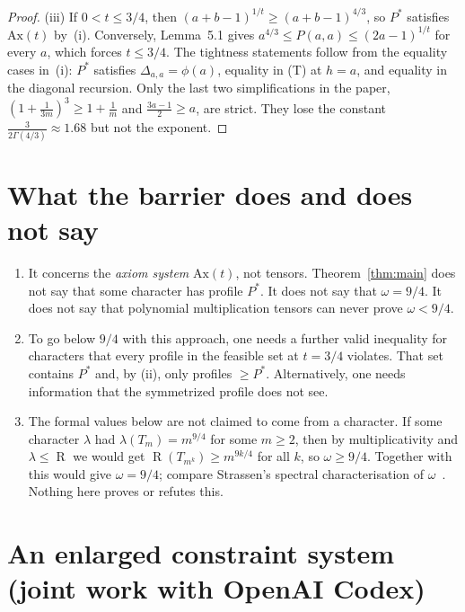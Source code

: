 \documentclass[11pt]{amsart}
\theoremstyle{remark}
\DeclareMathOperator{\rank}{R}
\begin{document}
\begin{proof}
(iii) If $0<t\le3/4$, then $(a+b-1)^{1/t}\ge(a+b-1)^{4/3}$, so $P^*$
satisfies $\mathrm{Ax}(t)$ by~(i). Conversely, Lemma~5.1 gives
$a^{4/3}\le P(a,a)\le(2a-1)^{1/t}$ for every $a$, which forces $t\le 3/4$.
The tightness statements follow from the equality cases in~(i): $P^*$
satisfies $\Delta_{a,a}=\phi(a)$, equality in (T) at $h=a$, and equality in
the diagonal recursion. Only the last two simplifications in the paper,
$(1+\frac1{3m})^3\ge1+\frac1m$ and $\frac{3a-1}{2}\ge a$, are strict. They
lose the constant $\frac3{2\Gamma(4/3)}\approx1.68$ but not the exponent.
\end{proof}

\section{What the barrier does and does not say}

\begin{enumerate}
\item It concerns the \emph{axiom system} $\mathrm{Ax}(t)$, not tensors.
Theorem~\ref{thm:main} does not say that some character has profile $P^*$.
It does not say that $\omega=9/4$. It does not say that polynomial
multiplication tensors can never prove $\omega<9/4$.
\item To go below $9/4$ with this approach, one needs a further valid
inequality for characters that every profile in the feasible set at
$t=3/4$ violates. That set contains $P^*$ and, by (ii), only profiles
$\ge P^*$. Alternatively, one needs information that the symmetrized profile
does not see.
\item The formal values below are not claimed to come from a character. If
some character $\lambda$ had $\lambda(T_m)=m^{9/4}$ for some $m\ge2$, then by
multiplicativity and $\lambda\le\rank$ we would get
$\rank(T_{m^k})\ge m^{9k/4}$ for all $k$, so $\omega\ge 9/4$. Together with~\cite{OAI} this
would give $\omega=9/4$; compare Strassen's spectral characterisation of
$\omega$~\cite{Str88}. Nothing here proves or refutes this.
\end{enumerate}

\section{An enlarged constraint system (joint work with OpenAI Codex)}\label{sec:enlarged}
\end{document}
